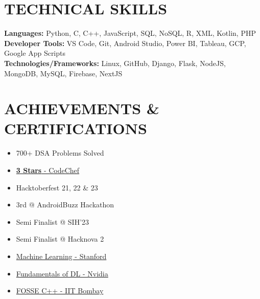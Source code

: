 \documentclass[letterpaper,11pt]{article}
\begin{document}
 

\section{TECHNICAL SKILLS}
 \begin{itemize}[leftmargin=0.15in, label={}]
    \small{\item{
     \textbf{\normalsize{Languages:}}{ \normalsize{Python, C, C++, JavaScript, SQL, NoSQL, R, XML, Kotlin, PHP}} \\
     \textbf{\normalsize{Developer Tools:}}{ \normalsize{VS Code, Git, Android Studio, Power BI, Tableau, GCP, Google App Scripts}} \\
     \textbf{\normalsize{Technologies/Frameworks:}}{ \normalsize{Linux, GitHub, Django, Flask, NodeJS, MongoDB, MySQL, Firebase, NextJS}} \\
    }}
 \end{itemize}
 \vspace{-15pt}

 
\section{ACHIEVEMENTS \& CERTIFICATIONS}
 \vspace{-1pt}

        \begin{multicols}{3}
            \begin{itemize}[itemsep=-4pt]
                \item 700+ DSA Problems Solved
                \item \href{https://www.codechef.com/users/ruthlessruler}{\textbf{3 Stars} - CodeChef {\raisebox{-0.1\height}{\faExternalLink*}} }
                \item Hacktoberfest 21, 22 \& 23
                \item 3rd @ AndroidBuzz Hackathon
                \item Semi Finalist @ SIH'23
                \item Semi Finalist @ Hacknova 2
                \item \href{https://coursera.org/share/c715d24542b410805a2ff3034949858d}{Machine Learning - Stanford {\raisebox{-0.1\height}{\faExternalLink*} }}
                \item \href{https://learn.next.courses.nvidia.com/certificates/b38a698150c5410c9afeb954cf87468c}{Fundamentals of DL - Nvidia {\raisebox{-0.1\height}{\faExternalLink*} }}
                \item \href{https://drive.google.com/file/d/1Oaf6gFga_AUU0Hix6qJHQsRd7Hopzjin/view}{FOSSE C++ - IIT Bombay {\raisebox{-0.1\height}{\faExternalLink*} }}

            \end{itemize}
        \end{multicols}
\end{document}

